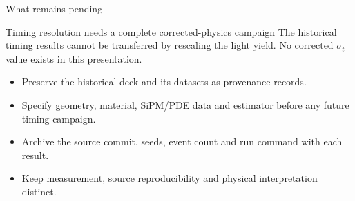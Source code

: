\begin{frame}{What remains pending}
\begin{block}{Timing resolution needs a complete corrected-physics campaign}
The historical timing results cannot be transferred by rescaling the light yield. No corrected $\sigma_t$ value exists in this presentation.
\end{block}
\begin{itemize}
\item Preserve the historical deck and its datasets as provenance records.
\item Specify geometry, material, SiPM/PDE data and estimator before any future timing campaign.
\item Archive the source commit, seeds, event count and run command with each result.
\item Keep measurement, source reproducibility and physical interpretation distinct.
\end{itemize}
\end{frame}
